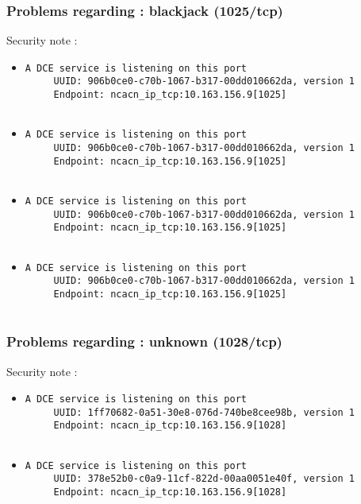 \documentclass{article}
\begin{document}
\subsubsection{Problems regarding : blackjack (1025/tcp)}
Security note :\\
\begin{itemize}
\item \begin{verbatim}
A DCE service is listening on this port
     UUID: 906b0ce0-c70b-1067-b317-00dd010662da, version 1
     Endpoint: ncacn_ip_tcp:10.163.156.9[1025]


\end{verbatim}\item \begin{verbatim}
A DCE service is listening on this port
     UUID: 906b0ce0-c70b-1067-b317-00dd010662da, version 1
     Endpoint: ncacn_ip_tcp:10.163.156.9[1025]


\end{verbatim}\item \begin{verbatim}
A DCE service is listening on this port
     UUID: 906b0ce0-c70b-1067-b317-00dd010662da, version 1
     Endpoint: ncacn_ip_tcp:10.163.156.9[1025]


\end{verbatim}\item \begin{verbatim}
A DCE service is listening on this port
     UUID: 906b0ce0-c70b-1067-b317-00dd010662da, version 1
     Endpoint: ncacn_ip_tcp:10.163.156.9[1025]


\end{verbatim}\end{itemize}
\subsubsection{Problems regarding : unknown (1028/tcp)}
Security note :\\
\begin{itemize}
\item \begin{verbatim}
A DCE service is listening on this port
     UUID: 1ff70682-0a51-30e8-076d-740be8cee98b, version 1
     Endpoint: ncacn_ip_tcp:10.163.156.9[1028]


\end{verbatim}\item \begin{verbatim}
A DCE service is listening on this port
     UUID: 378e52b0-c0a9-11cf-822d-00aa0051e40f, version 1
     Endpoint: ncacn_ip_tcp:10.163.156.9[1028]


\end{verbatim}\end{itemize}
\end{document}
